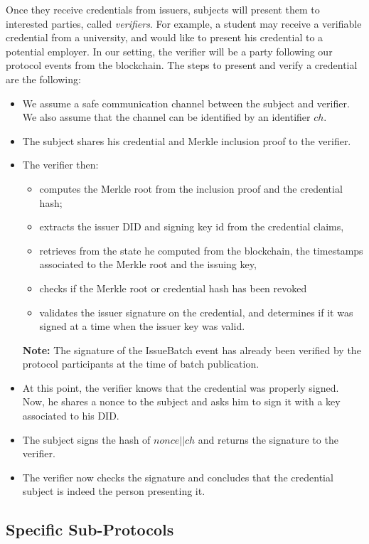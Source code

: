 \documentclass[10pt,a4paper]{article}
\begin{document}
Once they receive credentials from issuers, subjects will present them to interested parties, called \emph{verifiers}. For example, a student may receive a verifiable credential from a university, and would like to present his credential to a potential employer. In our setting, the verifier will be a party following our protocol events from the blockchain. The steps to present and verify a credential are the following:
\begin{itemize}
\item We assume a safe communication channel between the subject and verifier.
      We also assume that the channel can be identified by an identifier $ch$.
\item The subject shares his credential and Merkle inclusion proof to the verifier.
\item The verifier then: 
	\begin{itemize}
	\item computes the Merkle root from the inclusion proof and the credential hash;
	\item extracts the issuer DID and signing key id from the credential claims,
	\item retrieves from the state he computed from the blockchain, the timestamps associated to the Merkle root and the issuing key, 
	\item checks if the Merkle root or credential hash has been revoked
	\item validates the issuer signature on the credential, and determines if it was signed at a time when the issuer key was valid.
	\end{itemize}
  \textbf{Note:} The signature of the IssueBatch event has already been verified by the protocol participants at the time of batch publication. 
\item At this point, the verifier knows that the credential was properly signed. Now, he shares a nonce to the subject and asks him to sign it with a key associated to his DID.
\item The subject signs the hash of $nonce || ch$ and returns the signature to the verifier.
\item The verifier now checks the signature and concludes that the credential subject is indeed the person presenting it.
\end{itemize}

\subsection{Specific Sub-Protocols}
\label{ssec:subproto}
\end{document}
